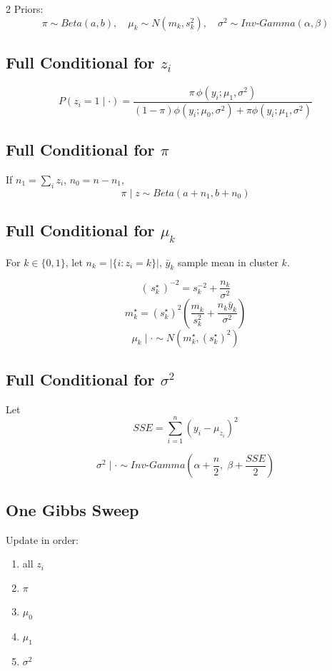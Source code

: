 \documentclass[10pt]{article}
\begin{document}
\begin{multicols}{2}
Priors:
\[
\pi\sim Beta(a,b),\quad
\mu_k\sim N(m_k,s_k^2),\quad
\sigma^2\sim Inv\text{-}Gamma(\alpha,\beta)
\]

\subsection{Full Conditional for \(z_i\)}

\begin{formulabox}
\[
P(z_i=1\mid \cdot)=
\frac{\pi\,\phi(y_i;\mu_1,\sigma^2)}
{(1-\pi)\phi(y_i;\mu_0,\sigma^2)+\pi\phi(y_i;\mu_1,\sigma^2)}
\]
\end{formulabox}

\subsection{Full Conditional for \(\pi\)}

If \(n_1=\sum_i z_i\), \(n_0=n-n_1\),
\[
\pi\mid z \sim Beta(a+n_1,b+n_0)
\]

\subsection{Full Conditional for \(\mu_k\)}

For \(k\in\{0,1\}\), let \(n_k=|\{i:z_i=k\}|\), \(\bar y_k\) sample mean in cluster \(k\).

\begin{formulabox}
\[
(\,s_k^\star\,)^{-2}=s_k^{-2}+\frac{n_k}{\sigma^2}
\]
\[
m_k^\star=(s_k^\star)^2
\left(
\frac{m_k}{s_k^2}+\frac{n_k\bar y_k}{\sigma^2}
\right)
\]
\[
\mu_k\mid \cdot \sim N(m_k^\star,(s_k^\star)^2)
\]
\end{formulabox}

\subsection{Full Conditional for \(\sigma^2\)}

Let
\[
SSE=\sum_{i=1}^n (y_i-\mu_{z_i})^2
\]

\begin{formulabox}
\[
\sigma^2\mid \cdot \sim Inv\text{-}Gamma\left(\alpha+\frac n2,\; \beta+\frac{SSE}{2}\right)
\]
\end{formulabox}

\subsection{One Gibbs Sweep}

Update in order:
\begin{enumerate}[leftmargin=14pt,itemsep=1pt]
\item all \(z_i\)
\item \(\pi\)
\item \(\mu_0\)
\item \(\mu_1\)
\item \(\sigma^2\)
\end{enumerate}


\end{multicols}
\end{document}
